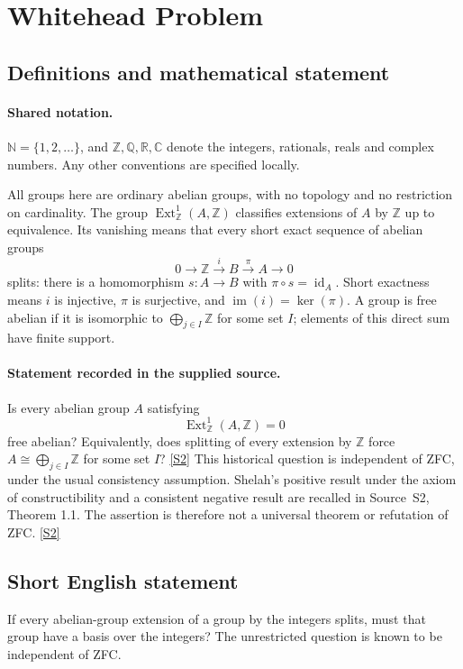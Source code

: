 \documentclass[11pt]{article}
\newcommand{\sref}[2]{\hyperlink{source:#1:#2}{[S#2]}}
\begin{document}
\section{Whitehead Problem}\label{statement}

\subsection{Definitions and mathematical statement}

\paragraph{Shared notation.}$\mathbb N=\{1,2,\ldots\}$, and $\mathbb Z,\mathbb Q,\mathbb R,\mathbb C$ denote the integers, rationals, reals and complex numbers. Any other conventions are specified locally.


All groups here are ordinary abelian groups, with no topology and no restriction on cardinality. The group $\operatorname{Ext}^1_{\mathbb Z}(A,\mathbb Z)$ classifies extensions of $A$ by $\mathbb Z$ up to equivalence. Its vanishing means that every short exact sequence of abelian groups
\[
 0\longrightarrow\mathbb Z\xrightarrow{i}B\xrightarrow{\pi}A\longrightarrow0
\]
splits: there is a homomorphism $s:A\to B$ with $\pi\circ s=\operatorname{id}_A$. Short exactness means $i$ is injective, $\pi$ is surjective, and $\operatorname{im}(i)=\ker(\pi)$. A group is free abelian if it is isomorphic to $\bigoplus_{j\in I}\mathbb Z$ for some set $I$; elements of this direct sum have finite support.
\paragraph{Statement recorded in the supplied source.}
Is every abelian group $A$ satisfying
\[
 \operatorname{Ext}^1_{\mathbb Z}(A,\mathbb Z)=0
\]
free abelian? Equivalently, does splitting of every extension by $\mathbb Z$ force $A\cong\bigoplus_{j\in I}\mathbb Z$ for some set $I$? \sref{statement}{2}
This historical question is independent of ZFC, under the usual consistency assumption. Shelah's positive result under the axiom of constructibility and a consistent negative result are recalled in Source~S2, Theorem 1.1. The assertion is therefore not a universal theorem or refutation of ZFC. \sref{statement}{2}
\subsection{Short English statement}
If every abelian-group extension of a group by the integers splits, must that group have a basis over the integers? The unrestricted question is known to be independent of ZFC.
\end{document}
